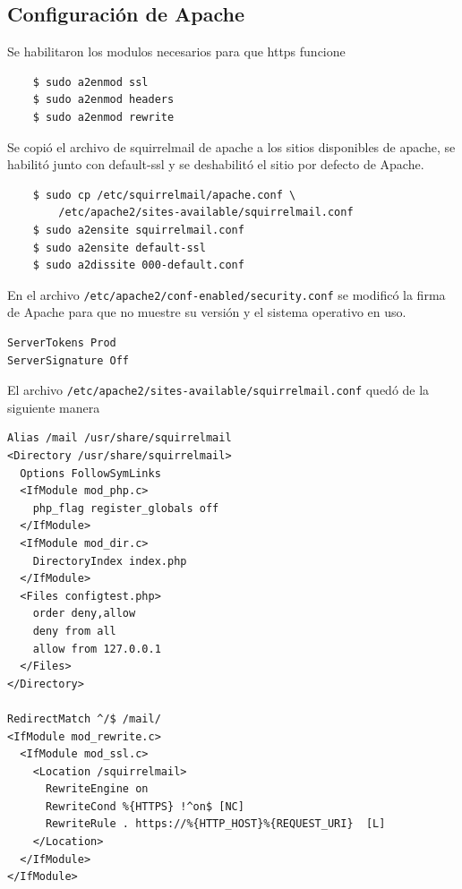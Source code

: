 \documentclass[12pt]{article}
\begin{document}

\subsection{Configuración de Apache}

Se habilitaron los modulos necesarios para que \textsf{https} funcione \\
\begin{verbatim}
    $ sudo a2enmod ssl
    $ sudo a2enmod headers
    $ sudo a2enmod rewrite
\end{verbatim}

Se copió el archivo de squirrelmail de apache a los sitios disponibles de apache, se habilitó junto con \textsf{default-ssl} y se deshabilitó el sitio por defecto de Apache. \\
\begin{verbatim}
    $ sudo cp /etc/squirrelmail/apache.conf \
        /etc/apache2/sites-available/squirrelmail.conf
    $ sudo a2ensite squirrelmail.conf
    $ sudo a2ensite default-ssl
    $ sudo a2dissite 000-default.conf
\end{verbatim}

En el archivo \texttt{/etc/apache2/conf-enabled/security.conf} se modificó la firma de Apache para que no muestre su versión y el sistema operativo en uso. \\
\begin{verbatim}
ServerTokens Prod
ServerSignature Off
\end{verbatim}

El archivo \texttt{/etc/apache2/sites-available/squirrelmail.conf} quedó de la siguiente manera
\begin{verbatim}
Alias /mail /usr/share/squirrelmail
<Directory /usr/share/squirrelmail>
  Options FollowSymLinks
  <IfModule mod_php.c>
    php_flag register_globals off
  </IfModule>
  <IfModule mod_dir.c>
    DirectoryIndex index.php
  </IfModule>
  <Files configtest.php>
    order deny,allow
    deny from all
    allow from 127.0.0.1
  </Files>
</Directory>

RedirectMatch ^/$ /mail/
<IfModule mod_rewrite.c>
  <IfModule mod_ssl.c>
    <Location /squirrelmail>
      RewriteEngine on
      RewriteCond %{HTTPS} !^on$ [NC]
      RewriteRule . https://%{HTTP_HOST}%{REQUEST_URI}  [L]
    </Location>
  </IfModule>
</IfModule>
\end{verbatim}
\end{document}
